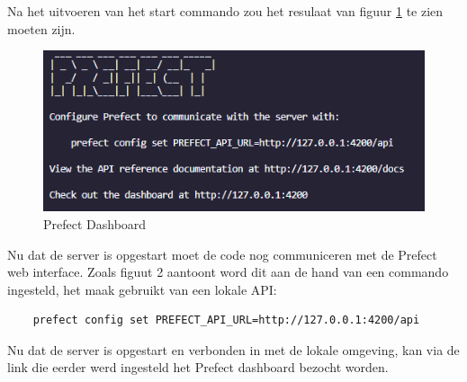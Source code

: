 Na het uitvoeren van het start commando zou het resulaat van figuur \ref{fig:Prefect_server} te zien moeten zijn.
\begin{figure}[]
    \includegraphics[width=\linewidth]{graphics/Prefect_server.PNG}
    \caption{Prefect Dashboard}
    \label{fig:Prefect_server}
\end{figure}
Nu dat de server is opgestart moet de code nog communiceren met de Prefect web interface. 
Zoals figuut 2 aantoont word dit aan de hand van een commando ingesteld, het maak gebruikt van een lokale API:
\begin{verbatim}
    prefect config set PREFECT_API_URL=http://127.0.0.1:4200/api
\end{verbatim}
Nu dat de server is opgestart en verbonden in met de lokale omgeving, kan via de link die eerder werd ingesteld het Prefect dashboard bezocht worden.
